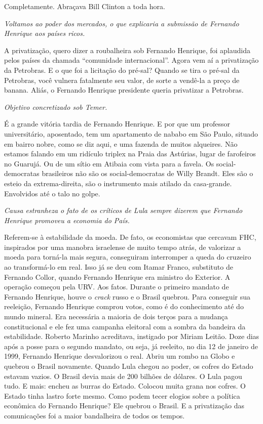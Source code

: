 \normalfont 
Completamente. Abraçava Bill Clinton a toda hora.

\itshape
 Voltamos ao poder dos mercados, o que explicaria a
submissão de Fernando Henrique aos países ricos.

\normalfont 
A privatização, quero dizer a roubalheira sob Fernando
Henrique, foi aplaudida pelos países da chamada ``comunidade
internacional''. Agora vem aí a privatização da Petrobras. E o que foi a
licitação do pré-sal? Quando se tira o pré-sal da Petrobras, você
vulnera fatalmente seu valor, de sorte a vendê-la a preço de banana.
Aliás, o Fernando Henrique presidente queria privatizar a Petrobras.

\itshape
 Objetivo concretizado sob Temer.

\normalfont 
É a grande vitória tardia de Fernando Henrique. E por que
um professor universitário, aposentado, tem um apartamento de nababo em
São Paulo, situado em bairro nobre, como se diz aqui, e uma fazenda de
muitos alqueires. Não estamos falando em um ridículo triplex na Praia
das Astúrias, lugar de farofeiros no Guarujá. Ou de um sítio em Atibaia
com vista para a favela. Os social-democratas brasileiros não são os
social-democratas de Willy Brandt. Eles são o esteio da extrema-direita,
são o instrumento mais atilado da casa-grande. Envolvidos até o talo no
golpe.

\itshape
 Causa estranheza o fato de os críticos de Lula sempre
dizerem que Fernando Henrique promoveu a economia do País.

\normalfont 
Referem-se à estabilidade da moeda. De fato, os
economistas que cercavam FHC, inspirados por uma manobra israelense de
muito tempo atrás, de valorizar a moeda para torná-la mais segura,
conseguiram interromper a queda do cruzeiro ao transformá-lo em real.
Isso já se deu com Itamar Franco, substituto de Fernando Collor, quando
Fernando Henrique era ministro do Exterior. A operação começou pela URV.
Aos fatos. Durante o primeiro mandato de Fernando Henrique, houve o
\emph{crack} russo e o Brasil quebrou. Para conseguir sua reeleição,
Fernando Henrique comprou votos, como é do conhecimento até do mundo
mineral. Era necessária a maioria de dois terços para a mudança
constitucional e ele fez uma campanha eleitoral com a sombra da bandeira
da estabilidade. Roberto Marinho acreditava, instigado por Miriam
Leitão. Doze dias após a posse para o segundo mandato, ou seja, já
reeleito, no dia 12 de janeiro de 1999, Fernando Henrique desvalorizou o
real. Abriu um rombo na Globo e quebrou o Brasil novamente. Quando Lula
chegou ao poder, os cofres do Estado estavam vazios. O Brasil devia mais
de 200 bilhões de dólares. O Lula pagou tudo. E mais: encheu as burras
do Estado. Colocou muita grana nos cofres. O Estado tinha lastro forte
mesmo. Como podem tecer elogios sobre a política econômica do Fernando
Henrique? Ele quebrou o Brasil. E a privatização das comunicações foi a
maior bandalheira de todos os tempos.

